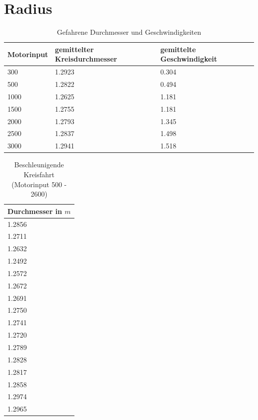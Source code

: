 \documentclass[10pt]{article}
\begin{document}
\section{Radius}
    \begin{table}[tb]
        \caption{Gefahrene Durchmesser und Geschwindigkeiten}
        \label{tab:radius_table1}
        \centering
        \begin{tabular}{|l|l|l|}
        Motorinput & gemittelter Kreisdurchmesser & gemittelte Geschwindigkeit \\ \hline
        300        & 1.2923                       & 0.304                      \\
        500        & 1.2822                       & 0.494                      \\
        1000       & 1.2625                       & 1.181                      \\
        1500       & 1.2755                       & 1.181                      \\
        2000       & 1.2793                       & 1.345                      \\
        2500       & 1.2837                       & 1.498                      \\
        3000       & 1.2941                       & 1.518
        \end{tabular}
    \end{table}
\begin{table}
        \caption{Beschleunigende Kreisfahrt (Motorinput 500 - 2600)}
        \label{tab:beschleunigende_kreisfahrt}
        \centering
        \begin{tabular}{|l|}
        Durchmesser in $m$ \\\hline
        1.2856                 \\
        1.2711                 \\
        1.2632                 \\
        1.2492                 \\
        1.2572                 \\
        1.2672                 \\
        1.2691                 \\
        1.2750                 \\
        1.2741                 \\
        1.2720                 \\
        1.2789                 \\
        1.2828                 \\
        1.2817                 \\
        1.2858                 \\
        1.2974                 \\
        1.2965
        \end{tabular}
    \end{table}
\end{document}
